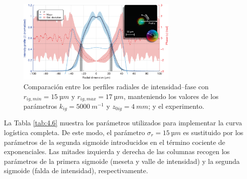 \begin{figure}[htbp!]
  \centering
  \includegraphics[width=0.7\textwidth]{Figuras/ch4_cmp42.png}
  \caption{Comparación entre los perfiles radiales de intensidad--fase con $r_{ig,min}=\qty{15}{µm}$ y $r_{ig,max}=\qty{17}{µm}$, manteniendo los valores de los parámetros $k_{ig}=\qty{5000}{m^{-1}}$ y $z_{0ig}=\qty{4}{mm}$; y el experimento.}
  \label{fig:4.22}
\end{figure}

La Tabla \ref{tab:4.6} muestra los parámetros utilizados para implementar la curva logística completa. De este modo, el parámetro $\sigma_{r}=\qty{15}{µm}$ es sustituido por los parámetros de la segunda sigmoide introducidos en el término cociente de exponenciales. Las mitades izquierda y derecha de las columnas recogen los parámetros de la primera sigmoide (meseta y valle de intensidad) y la segunda sigmoide (falda de intensidad), respectivamente.

